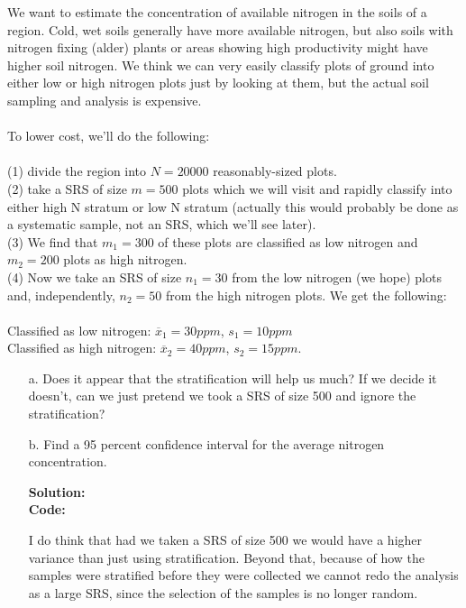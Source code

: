 \documentclass[12pt]{article}
\makeatletter
\theoremstyle{homework}
\newenvironment{exercise}[1]
{\def\@currentlabel{#1}\exercisecore}
{\endexercisecore}
\newcommand{\localhead}[1]{\par\smallskip\noindent\textbf{#1}\nobreak\\}%
\newcommand\solution{\localhead{Solution:}}
\makeatother
\begin{document}
\begin{exercise}{4.}We want to estimate the concentration of available nitrogen in the soils of a region. 
    Cold, wet soils generally have more available nitrogen, but also soils with nitrogen fixing (alder) 
    plants or areas showing high productivity might have higher soil nitrogen. We think we can very easily 
    classify plots of ground into either low or high nitrogen plots just by looking at them, but the actual 
    soil sampling and analysis is expensive. \\\\

    To lower cost, we’ll do the following: \\\\
    
    \noindent(1) divide the region into $N = 20000$ reasonably-sized plots.\\ 
    (2) take a SRS of size $m = 500$ plots which 
    we will visit and rapidly classify into either high N stratum or low N stratum (actually this would
    probably be done as a systematic sample, not an SRS, which we’ll see later).\\
    (3) We find that $m_1 = 300$ of these plots are classified as low nitrogen and $m_2 = 200$ plots as high nitrogen.\\
    (4) Now we take an SRS of size $n_1 = 30$ from the low nitrogen (we hope) plots and, independently, $n_2 = 50$ from 
    the high nitrogen plots. We get the following:\\\\
    
    \noindent Classified as low nitrogen: $\overline{x}_1 = 30ppm$, $s_1 = 10ppm$\\
    Classified as high nitrogen: $\overline{x}_2 = 40ppm$, $s_2 = 15ppm$.
    \begin{enumerate}
        \item[a.] Does it appear that the stratification will help us much? If we decide it doesn’t, 
        can we just pretend we took a SRS of size 500 and ignore the stratification? \\
        \item[b.] Find a 95 percent confidence interval for the average nitrogen concentration.\\
        \solution
        \textbf{Code:}
        \begin{center}
        
        \end{center}
        I do think that had we taken a SRS of size 500 we would have a higher variance than just using stratification. 
        Beyond that, because of how the samples were stratified before they were collected we cannot redo the analysis 
        as a large SRS, since the selection of the samples is no longer random. \\
        \vspace{.15in}
    \end{enumerate}
    
\end{exercise}
\end{document}
